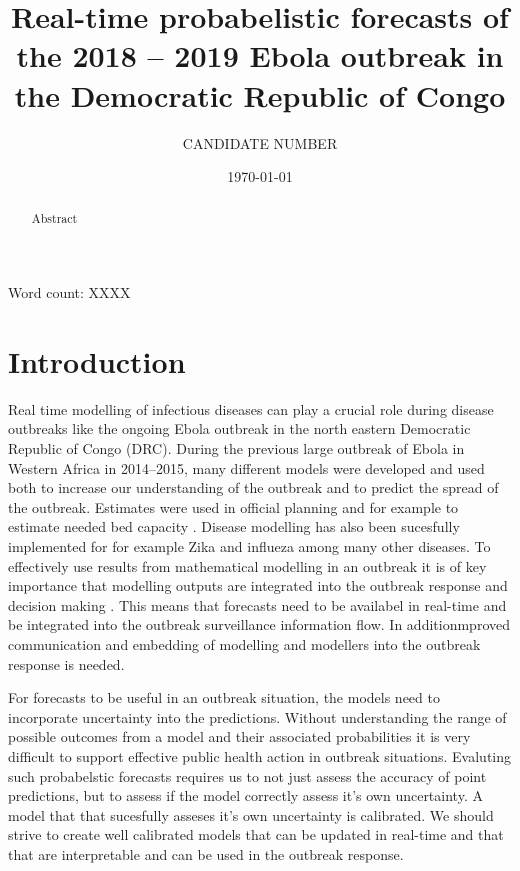 \documentclass[12pt]{article}
\title{Real-time probabelistic forecasts of the 2018 -- 2019 Ebola outbreak in the Democratic Republic of Congo}
\author{
  CANDIDATE NUMBER
}
\date{\today}
\begin{document}
\maketitle


Word count: XXXX

\begin{abstract}
  Abstract

\end{abstract}

\newpage

\tableofcontents

\newpage

\section{Introduction}


Real time modelling of infectious diseases can play a crucial role during disease outbreaks like the ongoing Ebola outbreak in the north eastern Democratic Republic of Congo (DRC). During the previous large outbreak of Ebola in Western Africa in 2014--2015, many different models were developed\cite{chretienMathematicalModelingWest} and used both to increase our understanding of the outbreak and to predict the spread of the outbreak. Estimates were used in official planning\cite{EbolaVirusDisease2014}  and for example to estimate needed bed capacity \cite{camachoTemporalChangesEbola2015}. Disease modelling has also been sucesfully implemented for for example Zika \cite{kobresSystematicReviewEvaluation2019} and influeza \cite{chretienInfluenzaForecastingHuman2014} among many other diseases. To effectively use results from mathematical modelling in an outbreak it is of key importance that modelling outputs are integrated into the outbreak response and decision making \cite{riversUsingOutbreakScience2019a}. This means that forecasts need to be availabel in real-time and be integrated into the outbreak surveillance information flow. In additionmproved communication and embedding of modelling and modellers into the outbreak response is needed. 

For forecasts to be useful in an outbreak situation, the models need to incorporate uncertainty into the predictions\cite{funkAssessingPerformanceRealtime2019, weiCalibrationTestsCount2014,gneitingEditorialProbabilisticForecasting2008}. Without understanding the range of possible outcomes from a model and their associated probabilities it is very difficult to support effective public health action in outbreak situations. Evaluting such probabelstic forecasts requires us to not just assess the accuracy of point predictions, but to assess if the model correctly assess it's own uncertainty. A model that that sucesfully asseses it's own uncertainty is calibrated. We should strive to create well calibrated models that can be updated in real-time and that that are interpretable and can be used in the outbreak response. 
\end{document}
